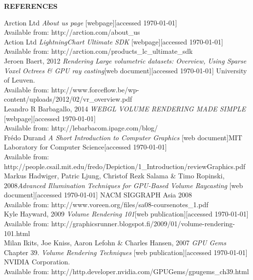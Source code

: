 \documentclass[twoside, english, 11pt]{report}
\begin{document}
\newpage

\LARGE \textbf{REFERENCES}\\

\small Arction Ltd \textit{About us page} [webpage][accessed \today] \\
Available from: http://arction.com/about\_us\\

\small Action Ltd \textit{LightningChart Ultimate SDK} [webpage][accessed \today] \\
Available from: http://arction.com/products\_lc\_ultimate\_sdk\\

\small Jeroen Baert, 2012 \textit{Rendering Large volumetric datasets: Overview, Using Sparse Voxel Octrees \& GPU ray casting}[web document][accessed \today] University of Leuven.\\
Available from: http://www.forceflow.be/wp-content/uploads/2012/02/vr\_overview.pdf\\

\small Leandro R Barbagallo, 2014 \textit{WEBGL VOLUME RENDERING MADE SIMPLE} [webpage][accessed \today]\\ 
Available from: http://lebarbacom.ipage.com/blog/\\

\small Frédo Durand \textit{A Short Introduction to Computer Graphics} [web document]MIT Laboratory for Computer Science[accessed \today] \\
Available from: http://people.csail.mit.edu/fredo/Depiction/1\_Introduction/reviewGraphics.pdf\\

\small Markus Hadwiger, Patric Ljung, Christof Rezk Salama \& Timo Ropinski, 2008\textit{Advanced Illumination Techniques for GPU-Based Volume Raycasting} [web document][accessed \today] NACM SIGGRAPH Asia 2008 \\
Available from: http://www.voreen.org/files/sa08-coursenotes\_1.pdf\\

\small Kyle Hayward, 2009 \textit{Volume Rendering 101}[web publication][accessed \today]
Available from: http://graphicsrunner.blogspot.fi/2009/01/volume-rendering-101.html\\

\small Milan Ikits, Joe Kniss, Aaron Lefohn \& Charles Hansen, 2007 \textit{GPU Gems} Chapter 39. \textit{Volume Rendering Techniques} [web publication][accessed \today] NVIDIA Corporation.\\
Available from: http://http.developer.nvidia.com/GPUGems/gpugems\_ch39.html\\
\end{document}
